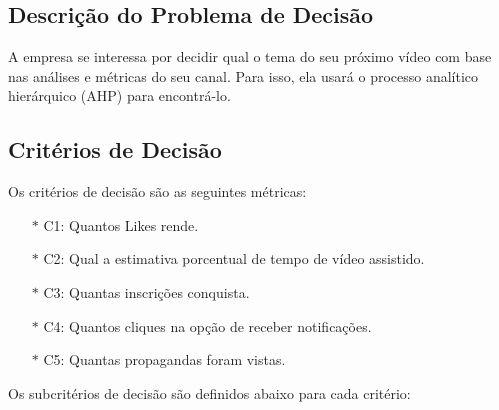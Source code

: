 \documentclass[onecolumn,11pt]{asme2ej}
\begin{document}
\subsection{Descrição do Problema de Decisão}

A empresa se interessa por decidir qual o tema do seu próximo vídeo com base nas análises e métricas do seu canal. Para isso, ela usará o processo analítico hierárquico (AHP) para encontrá-lo.

\subsection{Critérios de Decisão}

Os critérios de decisão são as seguintes métricas:

\begin{itemize}
    \item[$*$] C1: Quantos Likes rende.
    \item[$*$] C2: Qual a estimativa porcentual de tempo de vídeo assistido.
    \item[$*$] C3: Quantas inscrições conquista.
    \item[$*$] C4: Quantos cliques na opção de receber notificações.
    \item[$*$] C5: Quantas propagandas foram vistas.
\end{itemize}

Os subcritérios de decisão são definidos abaixo para cada critério:
\end{document}
